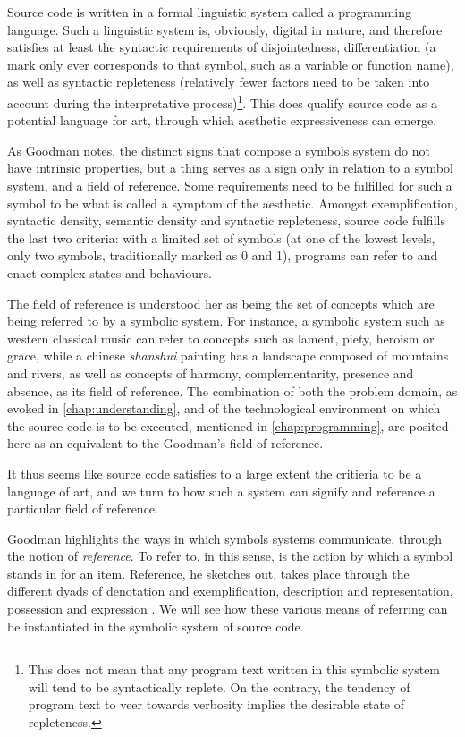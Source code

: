 Source code is written in a formal linguistic system called a programming language. Such a linguistic system is, obviously, digital in nature, and therefore satisfies at least the syntactic requirements of disjointedness, differentiation (a mark only ever corresponds to that symbol, such as a variable or function name), as well as syntactic repleteness (relatively fewer factors need to be taken into account during the interpretative process)\footnote{This does not mean that any program text written in this symbolic system will tend to be syntactically replete. On the contrary, the tendency of program text to veer towards verbosity implies the desirable state of repleteness.}. This does qualify source code as a potential language for art, through which aesthetic expressiveness can emerge.

As Goodman notes, the distinct signs that compose a symbols system do not have intrinsic properties, but a thing serves as a sign only in relation to a symbol system, and a field of reference. Some requirements need to be fulfilled for such a symbol to be what is called a symptom of the aesthetic. Amongst exemplification, syntactic density, semantic density and syntactic repleteness, source code fulfills the last two criteria: with a limited set of symbols (at one of the lowest levels, only two symbols, traditionally marked as 0 and 1), programs can refer to and enact complex states and behaviours.

The field of reference is understood her as being the set of concepts which are being referred to by a symbolic system. For instance, a symbolic system such as western classical music can refer to concepts such as lament, piety, heroism or grace, while a chinese \emph{shanshui} painting has a landscape composed of mountains and rivers, as well as concepts of harmony, complementarity, presence and absence, as its field of reference. The combination of both the problem domain, as evoked in \ref{chap:understanding}, and of the technological environment on which the source code is to be executed, mentioned in \ref{chap:programming}, are posited here as an equivalent to the Goodman's field of reference.

It thus seems like source code satisfies to a large extent the critieria to be a language of art, and we turn to how such a system can signify and reference a particular field of reference.

Goodman highlights the ways in which symbols systems communicate, through the notion of \emph{reference}. To refer to, in this sense, is the action by which a symbol stands in for an item. Reference, he sketches out, takes place through the different dyads of denotation and exemplification, description and representation, possession and expression \citep{goodman_languages_1976}. We will see how these various means of referring can be instantiated in the symbolic system of source code.

